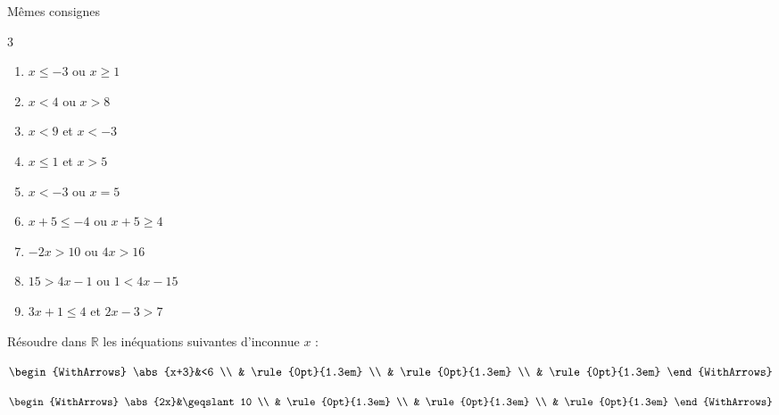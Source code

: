 \documentclass[main.tex]{subfiles}
\begin{document}
\begin{exercise}  \label{chapter04:exercice:inequation04}  Mêmes consignes \hfill
	\vspace{-1em} 
	\begin{multicols}{3}
\begin{enumerate}[label={$(I_{\arabic*})$\rule{0pt}{1.4em}},leftmargin=*]
	\item  $x\leqslant -3$ ou $x\geqslant 1$
	\item $x< 4$ ou $x> 8$
	\item  $x< 9$ et $x< -3$
	\item  $x\leqslant 1$ et $x> 5$
	\item  $x< -3$ ou $x= 5$
	\item $x+5\leqslant -4$ ou $x+5\geqslant 4$
	\item $-2x>10$ ou $4x>16$
	\item $15>4x-1$ ou $1<4x-15$ 
	\item $3x+1\leqslant 4$ et $2x-3>7$
\end{enumerate}
\end{multicols}  
\end{exercise}
\begin{example}  Résoudre dans $\mathbb{R}$ les inéquations suivantes d'inconnue $x$ :\hfill 
	
	\noindent \parbox{0.45\linewidth}{	
		$\begin{WithArrows}
			\abs{x+3}&<6   \\
			&  \rule{0pt}{1.3em}   \\
			&  \rule{0pt}{1.3em}   \\
			&  \rule{0pt}{1.3em}      
		\end{WithArrows}$ 	
	}\hfill \parbox{0.45\linewidth}{	
		$\begin{WithArrows}
			\abs{2x}&\geqslant 10 \\
			&  \rule{0pt}{1.3em}   \\
			&  \rule{0pt}{1.3em}   \\
			&  \rule{0pt}{1.3em}     
		\end{WithArrows}$ 
	}   
\end{example}
\end{document}
